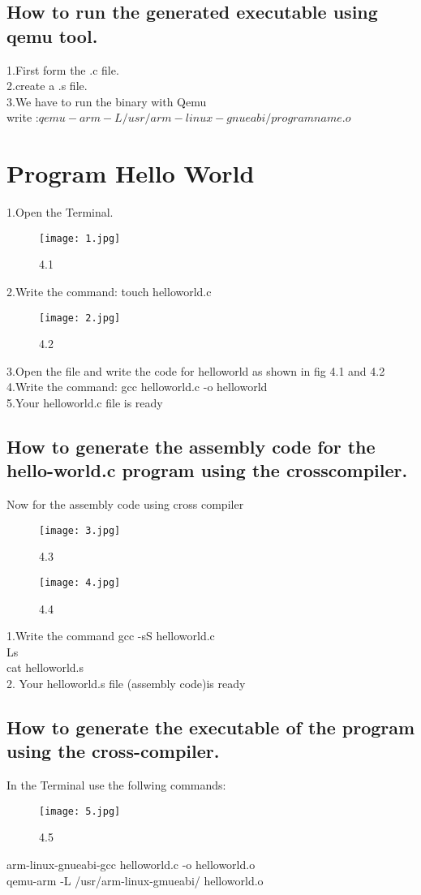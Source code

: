 \documentclass[a4paper,12pt]{article}
\begin{document}
\subsection{How to run the generated executable using qemu tool.} 
1.First form the .c file.\\
2.create a .s file.\\
3.We have to run the binary with Qemu\\
write :$ qemu-arm -L/usr/arm-linux-gnueabi/ program name.o$\\
\section{Program Hello World}
1.Open the Terminal.\\
 \begin{figure}[h]
	\texttt{[image: 1.jpg]}
	\caption{ 4.1}
\end{figure}
2.Write the command: touch  helloworld.c \\
\begin{figure}[h]
	\texttt{[image: 2.jpg]}
	\caption{ 4.2}
\end{figure}
3.Open the file and write the code for helloworld as shown in fig 4.1 and 4.2\\
4.Write the command: gcc helloworld.c -o helloworld\\
5.Your helloworld.c file is ready\\

\subsection{ How to generate the assembly code for the hello-world.c program using the crosscompiler. }
Now for the assembly code using cross compiler\\
 \begin{figure}[h]
	\texttt{[image: 3.jpg]}
	\caption{ 4.3}
\end{figure}
\begin{figure}[h]
	\texttt{[image: 4.jpg]}
	\caption{ 4.4}
\end{figure}
1.Write the command gcc -sS helloworld.c \\
Ls\\
cat helloworld.s\\
2. Your helloworld.s file (assembly code)is ready
\newpage
\subsection{How to generate the executable of the program using the cross-compiler. }
In the Terminal 
use the follwing commands: \\
\begin{figure}[h]
	\texttt{[image: 5.jpg]}
	\caption{ 4.5}
\end{figure}
arm-linux-gnueabi-gcc helloworld.c -o helloworld.o\\
qemu-arm -L /usr/arm-linux-gmueabi/ helloworld.o
\end{document}
